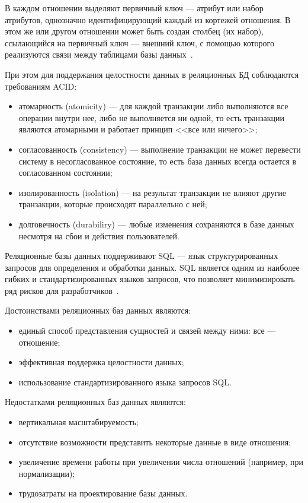 В каждом отношении выделяют первичный ключ --- атрибут или набор атрибутов,
однозначно идентифицирующий каждый из кортежей отношения. В этом же или другом
отношении может быть создан столбец (их набор), ссылающийся на первичный ключ
--- внешний ключ, с помощью которого реализуются связи между таблицами базы
данных~\cite{book03}.

При этом для поддержания целостности данных в реляционных БД соблюдаются
требованиям ACID:
\begin{itemize}
    \item атомарность (atomicity) --- для каждой транзакции либо выполняются все
        операции внутри нее, либо не выполняется ни одной, то есть
        транзакции являются атомарными и работает принцип <<все или ничего>>;
    \item согласованность (consistency) --- выполнение транзакции не может
        перевести систему в несогласованное состояние, то есть база данных
        всегда остается в согласованном состоянии;
    \item изолированность (isolation) --- на результат транзакции не влияют
        другие транзакции, которые происходят параллельно с ней;
    \item долговечность (durabiliry) --- любые изменения сохраняются в базе
        данных несмотря на сбои и действия пользователей.
\end{itemize}

Реляционные базы данных поддерживают SQL --- язык структурированных запросов для
определения и обработки данных. SQL является одним из наиболее гибких и
стандартизированных языков запросов, что позволяет минимизировать ряд рисков
для разработчиков~\cite{art04}.

Достоинствами реляционных баз данных являются:
\begin{itemize}
    \item единый способ представления сущностей и связей между ними:
        все --- отношение;
    \item эффективная поддержка целостности данных;
    \item использование стандартизированного языка запросов SQL.
\end{itemize}

Недостатками реляционных баз данных являются:
\begin{itemize}
    \item вертикальная масштабируемость;
    \item отсутствие возможности представить некоторые данные в виде отношения;
    \item увеличение времени работы при увеличении числа отношений (например,
        при нормализации);
    \item трудозатраты на проектирование базы данных.
\end{itemize}

